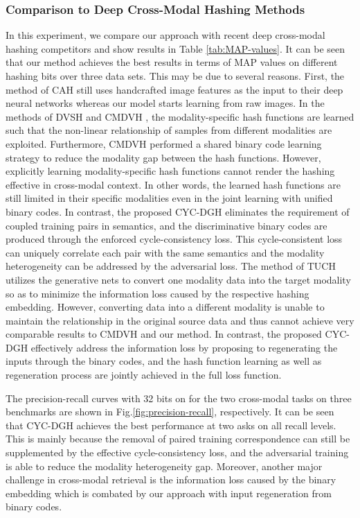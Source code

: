 \documentclass[10pt,journal,twocolumn]{IEEEtran}
\begin{document}
\subsubsection{Comparison to Deep Cross-Modal Hashing Methods}

In this experiment, we compare our approach with recent deep cross-modal hashing competitors and show results in Table \ref{tab:MAP-values}. It can be seen that our method achieves the best results in terms of MAP values on different hashing bits over three data sets. This may be due to several reasons. First, the method of CAH \cite{CAH} still uses handcrafted image features as the input to their deep neural networks whereas our model starts learning from raw images. In the methods of DVSH \cite{DVSH} and CMDVH \cite{CMDVH}, the modality-specific hash functions are learned such that the non-linear relationship of samples from different modalities are exploited. Furthermore, CMDVH \cite{CMDVH} performed a shared binary code learning strategy to reduce the modality gap between the hash functions. However, explicitly learning modality-specific hash functions cannot render the hashing effective in cross-modal context. In other words, the learned hash functions are still limited in their specific modalities even in the joint learning with unified binary codes. In contrast, the proposed CYC-DGH eliminates the requirement of coupled training pairs in semantics, and the discriminative binary codes are produced through the enforced cycle-consistency loss. This cycle-consistent loss can uniquely correlate each pair with the same semantics and the modality heterogeneity can be addressed by the adversarial loss. The method of TUCH \cite{TUCH} utilizes the generative nets to convert one modality data into the target modality so as to minimize the information loss caused by the respective hashing embedding. However, converting data into a different modality is unable to maintain the relationship in the original source data and thus cannot achieve very comparable results to CMDVH \cite{CMDVH} and our method. In contrast, the proposed CYC-DGH effectively address the information loss by proposing to regenerating the inputs through the binary codes, and the hash function learning as well as regeneration process are jointly achieved in the full loss function.


The precision-recall curves with 32 bits on for the two cross-modal tasks on three benchmarks are shown in Fig.\ref{fig:precision-recall}, respectively. It can be seen that CYC-DGH achieves the best performance at two asks on all recall levels. This is mainly because the removal of paired training correspondence can still be supplemented by the effective cycle-consistency loss, and the adversarial training is able to reduce the modality heterogeneity gap. Moreover, another major challenge in cross-modal retrieval is the information loss caused by the binary embedding which is combated by our approach with input regeneration from binary codes.
\end{document}
